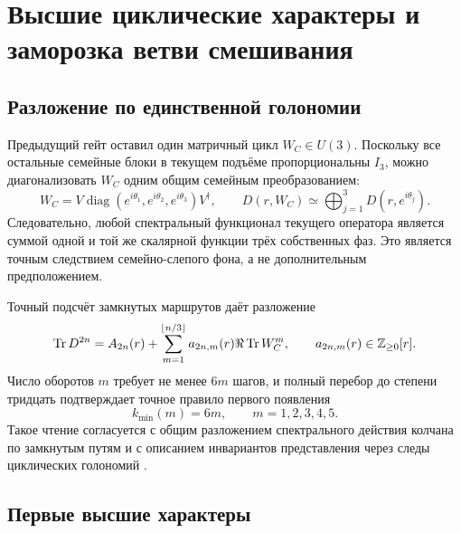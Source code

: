 \chapter{Высшие циклические характеры и заморозка ветви смешивания}
\label{ch:v7-higher-cycle-character-mixing-freeze-gate}

\section{Разложение по единственной голономии}

Предыдущий гейт оставил один матричный цикл $W_C\in U(3)$. Поскольку все
остальные семейные блоки в текущем подъёме пропорциональны $I_3$, можно
диагонализовать $W_C$ одним общим семейным преобразованием:
\begin{equation}
 W_C=V\operatorname{diag}(e^{i\theta_1},e^{i\theta_2},e^{i\theta_3})V^\dagger,
 \qquad
 D(r,W_C)\simeq\bigoplus_{j=1}^3D(r,e^{i\theta_j}).
 \label{eq:v7-higher-character-direct-sum}
\end{equation}
Следовательно, любой спектральный функционал текущего оператора является
суммой одной и той же скалярной функции трёх собственных фаз. Это является
точным следствием семейно-слепого фона, а не дополнительным предположением.

Точный подсчёт замкнутых маршрутов даёт разложение
\begin{equation}
 \operatorname{Tr} D^{2n}
 =A_{2n}(r)+
 \sum_{m=1}^{\lfloor n/3\rfloor}
 a_{2n,m}(r)\Re\operatorname{Tr} W_C^m,
 \qquad a_{2n,m}(r)\in\mathbb Z_{\ge0}[r].
 \label{eq:v7-higher-character-general-expansion}
\end{equation}
Число оборотов $m$ требует не менее $6m$ шагов, и полный перебор до степени
тридцать подтверждает точное правило первого появления
\begin{equation}
 k_{\min}(m)=6m,
 \qquad m=1,2,3,4,5.
 \label{eq:v7-higher-character-first-degree}
\end{equation}
Такое чтение согласуется с общим разложением спектрального действия колчана
по замкнутым путям и с описанием инвариантов представления через следы
циклических голономий \cite{v7-higher-character-perez,v7-higher-character-kassel}.

\section{Первые высшие характеры}


